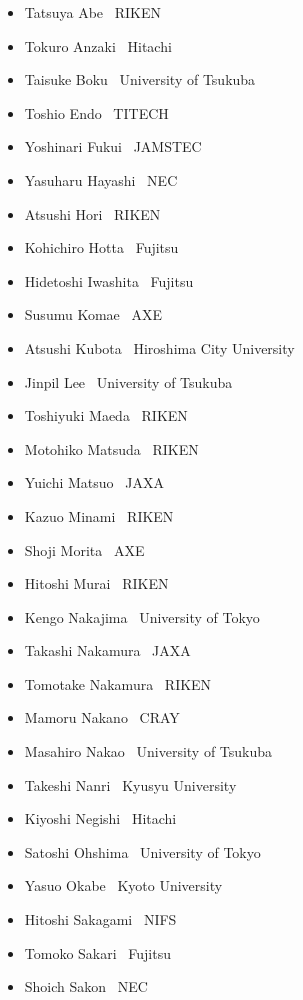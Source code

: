 \documentclass[a4paper,11pt,twoside]{report}
\begin{document}
\begin{itemize}
\setlength{\itemsep}{-1mm}
\item Tatsuya Abe        \dotfill \ RIKEN
\item Tokuro Anzaki      \dotfill \ Hitachi
\item Taisuke Boku       \dotfill \ University of Tsukuba
\item Toshio Endo        \dotfill \ TITECH
\item Yoshinari Fukui    \dotfill \ JAMSTEC
\item Yasuharu Hayashi   \dotfill \ NEC
\item Atsushi Hori       \dotfill \ RIKEN
\item Kohichiro Hotta    \dotfill \ Fujitsu
\item Hidetoshi Iwashita \dotfill \ Fujitsu
\item Susumu Komae       \dotfill \ AXE
\item Atsushi Kubota     \dotfill \ Hiroshima City University
\item Jinpil Lee         \dotfill \ University of Tsukuba
\item Toshiyuki Maeda    \dotfill \ RIKEN
\item Motohiko Matsuda   \dotfill \ RIKEN
\item Yuichi Matsuo      \dotfill \ JAXA
\item Kazuo Minami       \dotfill \ RIKEN
\item Shoji Morita       \dotfill \ AXE
\item Hitoshi Murai      \dotfill \ RIKEN
\item Kengo Nakajima     \dotfill \ University of Tokyo
\item Takashi Nakamura   \dotfill \ JAXA
\item Tomotake Nakamura  \dotfill \ RIKEN
\item Mamoru Nakano      \dotfill \ CRAY
\item Masahiro Nakao     \dotfill \ University of Tsukuba
\item Takeshi Nanri      \dotfill \ Kyusyu University
\item Kiyoshi Negishi    \dotfill \ Hitachi
\item Satoshi Ohshima    \dotfill \ University of Tokyo
\item Yasuo Okabe        \dotfill \ Kyoto University
\item Hitoshi Sakagami   \dotfill \ NIFS
\item Tomoko Sakari      \dotfill \ Fujitsu
\item Shoich Sakon       \dotfill \ NEC

\end{itemize}
\end{document}

